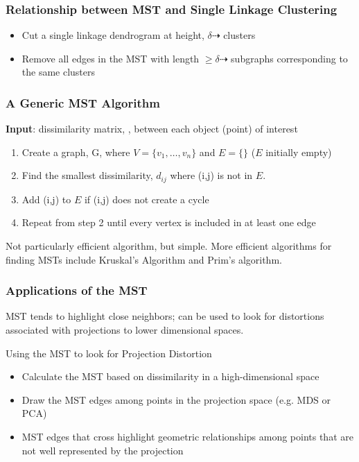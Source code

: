 \documentclass{beamer}
\begin{document}
\begin{frame}
  \frametitle{Relationship between MST and Single Linkage Clustering}


\begin{itemize}

\item Cut a single linkage dendrogram at height, $\delta \dashrightarrow$ clusters

\item Remove all edges in the MST with length $\geq \delta \dashrightarrow$ subgraphs corresponding to the same clusters

\end{itemize}

\end{frame}

\begin{frame}
  \frametitle{A Generic MST Algorithm}


\textbf{Input}: dissimilarity matrix, , between each object (point) of interest
\begin{enumerate}
\item Create a graph, G, where  $V = \{v_1,\ldots,v_n\}$ and $E =\{\}$ ($E$ initially empty)
\item Find the smallest dissimilarity, $d_{ij}$ where (i,j) is not in $E$.
\item Add (i,j) to $E$ if (i,j) does not create a cycle
\item Repeat from step 2 until every vertex is included in at least one edge
\end{enumerate}

Not particularly efficient algorithm, but simple. More efficient algorithms for finding MSTs include Kruskal's Algorithm and Prim's algorithm.

\end{frame}

\begin{frame}
  \frametitle{Applications of the MST}

MST tends to highlight close neighbors; can be used to look for distortions associated with projections to lower dimensional spaces.

\begin{block}{Using the MST to look for Projection Distortion}
\begin{itemize}
    \item  Calculate the MST based on dissimilarity in a high-dimensional space
    \item Draw the MST edges among points in the projection space (e.g. MDS or PCA)
    \item MST edges that cross highlight geometric relationships among points that are not well represented by the projection
\end{itemize}
\end{block}
\end{frame}
\end{document}
